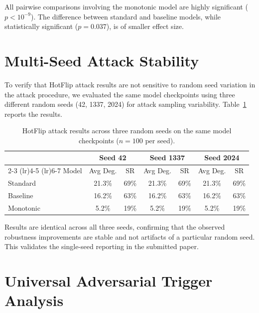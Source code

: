 \documentclass{article}
\begin{document}
All pairwise comparisons involving the monotonic model are highly significant ($p < 10^{-9}$). The difference between standard and baseline models, while statistically significant ($p = 0.037$), is of smaller effect size.


\section{Multi-Seed Attack Stability}
\label{sec:multi-seed}

To verify that HotFlip attack results are not sensitive to random seed variation in the attack procedure, we evaluated the same model checkpoints using three different random seeds (42, 1337, 2024) for attack sampling variability. Table~\ref{tab:multi-seed} reports the results.

\begin{table}[h]
\caption{HotFlip attack results across three random seeds on the same model checkpoints ($n = 100$ per seed).}
\label{tab:multi-seed}
\centering
\begin{tabular}{lcccccc}
\toprule
& \multicolumn{2}{c}{Seed 42} & \multicolumn{2}{c}{Seed 1337} & \multicolumn{2}{c}{Seed 2024} \\
\cmidrule(lr){2-3} \cmidrule(lr){4-5} \cmidrule(lr){6-7}
Model & Avg Deg. & SR & Avg Deg. & SR & Avg Deg. & SR \\
\midrule
Standard  & 21.3\% & 69\% & 21.3\% & 69\% & 21.3\% & 69\% \\
Baseline  & 16.2\% & 63\% & 16.2\% & 63\% & 16.2\% & 63\% \\
Monotonic &  5.2\% & 19\% &  5.2\% & 19\% &  5.2\% & 19\% \\
\bottomrule
\end{tabular}
\end{table}

Results are identical across all three seeds, confirming that the observed robustness improvements are stable and not artifacts of a particular random seed. This validates the single-seed reporting in the submitted paper.


\section{Universal Adversarial Trigger Analysis}
\label{sec:uat-detail}
\end{document}

